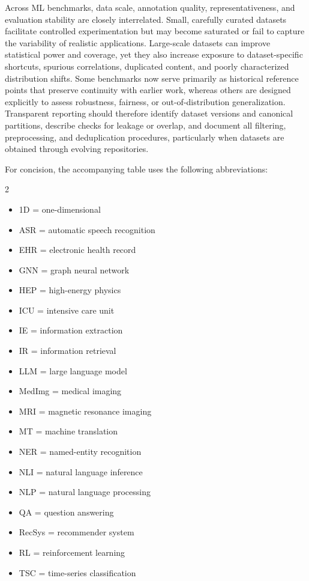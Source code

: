 \documentclass{article}
\begin{document}
Across ML benchmarks, data scale, annotation quality, representativeness, and evaluation stability are closely interrelated. Small, carefully curated datasets facilitate controlled experimentation but may become saturated or fail to capture the variability of realistic applications. Large-scale datasets can improve statistical power and coverage, yet they also increase exposure to dataset-specific shortcuts, spurious correlations, duplicated content, and poorly characterized distribution shifts. Some benchmarks now serve primarily as historical reference points that preserve continuity with earlier work, whereas others are designed explicitly to assess robustness, fairness, or out-of-distribution generalization. Transparent reporting should therefore identify dataset versions and canonical partitions, describe checks for leakage or overlap, and document all filtering, preprocessing, and deduplication procedures, particularly when datasets are obtained through evolving repositories.

For concision, the accompanying table uses the following abbreviations:

\begin{multicols}{2}
    \begin{itemize}\setlength{\itemsep}{0cm}
        \item 1D = one-dimensional
        \item ASR = automatic speech recognition
        \item EHR = electronic health record
        \item GNN = graph neural network
        \item HEP = high-energy physics
        \item ICU = intensive care unit
        \item IE = information extraction
        \item IR = information retrieval
        \item LLM = large language model
        \item MedImg = medical imaging
        \item MRI = magnetic resonance imaging
        \item MT = machine translation
        \item NER = named-entity recognition
        \item NLI = natural language inference
        \item NLP = natural language processing
        \item QA = question answering
        \item RecSys = recommender system
        \item RL = reinforcement learning
        \item TSC = time-series classification
    \end{itemize}
\end{multicols}
\end{document}
